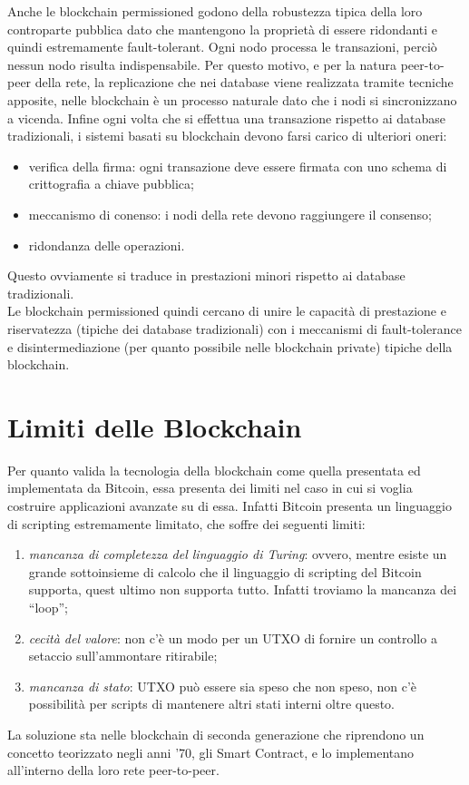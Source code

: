 Anche le blockchain permissioned godono della robustezza tipica della loro controparte pubblica dato che mantengono la proprietà di essere ridondanti e quindi estremamente fault-tolerant. Ogni nodo processa le transazioni, perciò nessun nodo risulta indispensabile. Per questo motivo, e per la natura peer-to-peer della rete, la replicazione che nei database viene realizzata tramite tecniche apposite, nelle blockchain è un processo naturale dato che i nodi si sincronizzano a vicenda. Infine ogni volta che si effettua una transazione rispetto ai database tradizionali, i sistemi basati su blockchain devono farsi carico di ulteriori oneri:
\begin{itemize}
	\item verifica della firma: ogni transazione deve essere firmata con uno schema di crittografia a chiave pubblica;
	\item meccanismo di conenso: i nodi della rete devono raggiungere il consenso;
	\item ridondanza delle operazioni.
\end{itemize}
Questo ovviamente si traduce in prestazioni minori rispetto ai database tradizionali.\\
Le blockchain permissioned quindi cercano di unire le capacità di prestazione e riservatezza (tipiche dei database tradizionali) con i meccanismi di fault-tolerance e disintermediazione (per quanto possibile nelle blockchain private) tipiche della blockchain.
%
\section{Limiti delle Blockchain}
%
Per quanto valida la tecnologia della blockchain come quella presentata ed implementata da Bitcoin, essa presenta dei limiti nel caso in cui si voglia costruire applicazioni avanzate su di essa. Infatti Bitcoin presenta un linguaggio di scripting estremamente limitato, che soffre dei seguenti limiti:
\begin{enumerate}
	\item \emph{mancanza di completezza del linguaggio di Turing}: ovvero, mentre esiste un grande sottoinsieme di calcolo che il linguaggio di scripting del Bitcoin supporta, quest ultimo non supporta tutto. Infatti troviamo la mancanza dei \enquote{loop};
	\item \emph{cecità del valore}: non c'è un modo per un UTXO di fornire un controllo a setaccio sull'ammontare ritirabile;
	\item \emph{mancanza di stato}: UTXO può essere sia speso che non speso, non c'è possibilità per scripts di mantenere altri stati interni oltre questo.
\end{enumerate}
La soluzione sta nelle blockchain di seconda generazione che riprendono un concetto teorizzato negli anni '70, gli Smart Contract, e lo implementano all'interno della loro rete peer-to-peer.
%
